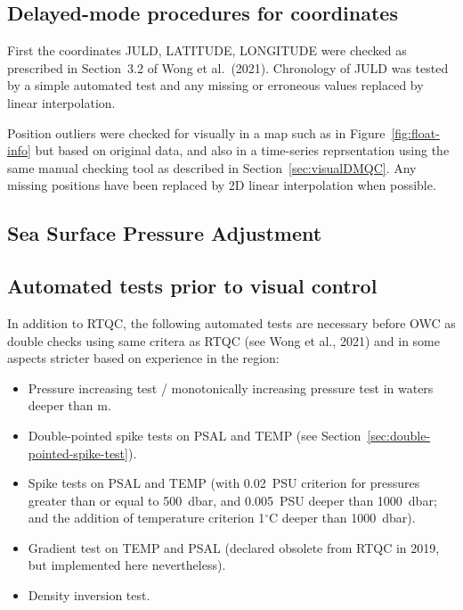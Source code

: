 \documentclass{article}
\begin{document}
\subsection{Delayed-mode procedures for coordinates}\label{sec:DM-coordinates}
First the coordinates JULD, LATITUDE, LONGITUDE were checked as prescribed
in Section~3.2 of Wong et al.~(2021).
%
Chronology of JULD was tested by a simple automated test and any missing
or erroneous values replaced by linear interpolation.


Position outliers were checked for visually in a map such as in
Figure~\ref{fig:float-info} but based on original data, and also in a
time-series reprsentation using the same manual checking tool as described
in Section~\ref{sec:visualDMQC}. Any missing positions have been replaced by 2D
linear interpolation when possible.



\newpage
\subsection{Sea Surface Pressure Adjustment}


\newpage
\subsection{Automated tests prior to visual control}\label{sec:automatedDMQC}
In addition to RTQC, the following automated tests are necessary before 
OWC as double checks using same critera as RTQC (see Wong et al., 2021)
and in some aspects stricter based on experience in the region:
\begin{itemize}
\item Pressure increasing test / monotonically increasing pressure test in
  waters deeper than m.
\item Double-pointed spike tests on PSAL and TEMP (see Section~\ref{sec:double-pointed-spike-test}).
\item Spike tests on PSAL and TEMP (with 0.02~PSU criterion for pressures
  greater than or equal to 500~dbar, and 0.005~PSU deeper than 1000~dbar;
  and the addition of temperature criterion 1$^\circ$C deeper than 1000~dbar).
\item Gradient test on TEMP and PSAL (declared obsolete from RTQC in 2019,
  but implemented here nevertheless).
\item Density inversion test.
\end{itemize}
\end{document}
